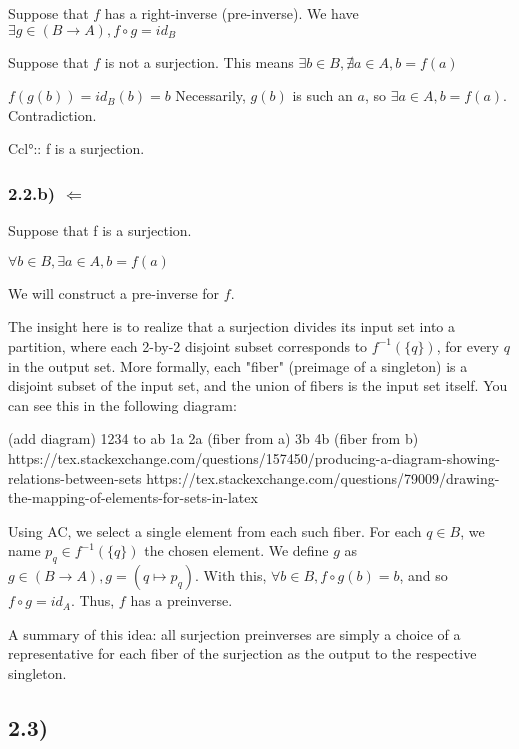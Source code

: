 \documentclass[12pt, letterpaper, twoside]{report}
\begin{document}
Suppose that $f$ has a right-inverse (pre-inverse).
We have $\exists g \in (B \to A), f \circ g = id_B$

Suppose that $f$ is not a surjection. This means $\exists b \in B, \nexists a \in A, b = f(a)$

$f(g(b))= id_B (b) = b$ Necessarily, $g(b)$ is such an $a$, so $\exists a \in A, b = f(a)$. Contradiction.


Ccl°:: f is a surjection.


\subsubsection*{2.2.b) $\Leftarrow$}

Suppose that f is a surjection.

$\forall b \in B, \exists a \in A, b = f(a)$

We will construct a pre-inverse for $f$.

The insight here is to realize that a surjection divides its input set into a partition, where each 2-by-2 disjoint subset corresponds to $f^{-1}(\{q\})$, for every $q$ in the output set. More formally, each "fiber" (preimage of a singleton) is a disjoint subset of the input set, and the union of fibers is the input set itself. You can see this in the following diagram:

(add diagram)
1234 to ab
1a 2a (fiber from a)
3b 4b (fiber from b)
https://tex.stackexchange.com/questions/157450/producing-a-diagram-showing-relations-between-sets
https://tex.stackexchange.com/questions/79009/drawing-the-mapping-of-elements-for-sets-in-latex

Using AC, we select a single element from each such fiber. For each $q \in B$, we name $p_q \in f^{-1}(\{q\})$ the chosen element. We define $g$ as $g \in (B \to A), g = (q \mapsto p_q)$. With this, $\forall b \in B, f \circ g (b) = b$, and so $f \circ g = id_A$. Thus, $f$ has a preinverse.

A summary of this idea: all surjection preinverses are simply a choice of a representative for each fiber of the surjection as the output to the respective singleton.



\subsection*{2.3)}
\end{document}

